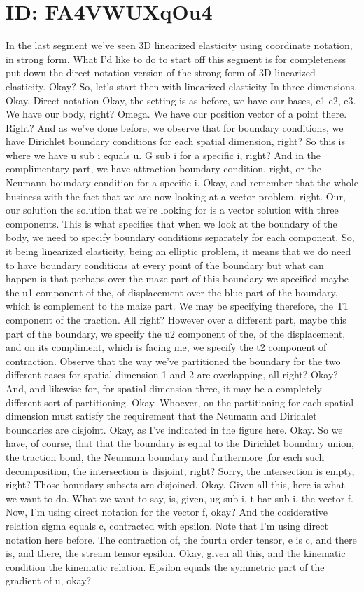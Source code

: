 \documentclass[10pt]{article}
\begin{document}
\section*{ID: FA4VWUXqOu4}
In the last segment we've seen 3D linearized elasticity using coordinate notation, in strong form. What I'd like to do to start off this segment is for completeness put down the direct notation version of the strong form of 3D linearized elasticity. Okay? So, let's start then with linearized elasticity In three dimensions. Okay. Direct notation Okay, the setting is as before, we have our bases, e1 e2, e3. We have our body, right? Omega. We have our position vector of a point there. Right? And as we've done before, we observe that for boundary conditions, we have Dirichlet boundary conditions for each spatial dimension, right? So this is where we have u sub i equals u. G sub i for a specific i, right? And in the complimentary part, we have attraction boundary condition, right, or the Neumann boundary condition for a specific i. Okay, and remember that the whole business with the fact that we are now looking at a vector problem, right. Our, our solution the solution that we're looking for is a vector solution with three components. This is what specifies that when we look at the boundary of the body, we need to specify boundary conditions separately for each component. So, it being linearized elasticity, being an elliptic problem, it means that we do need to have boundary conditions at every point of the boundary but what can happen is that perhaps over the maze part of this boundary we specified maybe the u1 component of the, of displacement over the blue part of the boundary, which is complement to the maize part. We may be specifying therefore, the T1 component of the traction. All right? However over a different part, maybe this part of the boundary, we specify the u2 component of the, of the displacement, and on its compliment, which is facing me, we specify the t2 component of contraction. Observe that the way we've partitioned the boundary for the two different cases for spatial dimension 1 and 2 are overlapping, all right? Okay? And, and likewise for, for spatial dimension three, it may be a completely different sort of partitioning. Okay. Whoever, on the partitioning for each spatial dimension must satisfy the requirement that the Neumann and Dirichlet boundaries are disjoint. Okay, as I've indicated in the figure here. Okay. So we have, of course, that that the boundary is equal to the Dirichlet boundary union, the traction bond, the Neumann boundary and furthermore ,for each such decomposition, the intersection is disjoint, right? Sorry, the intersection is empty, right? Those boundary subsets are disjoined. Okay. Given all this, here is what we want to do. What we want to say, is, given, ug sub i, t bar sub i, the vector f. Now, I'm using direct notation for the vector f, okay? And the cosiderative relation sigma equals c, contracted with epsilon. Note that I'm using direct notation here before. The contraction of, the fourth order tensor, e is c, and there is, and there, the stream tensor epsilon. Okay, given all this, and the kinematic condition the kinematic relation. Epsilon equals the symmetric part of the gradient of u, okay? 
\end{document}
